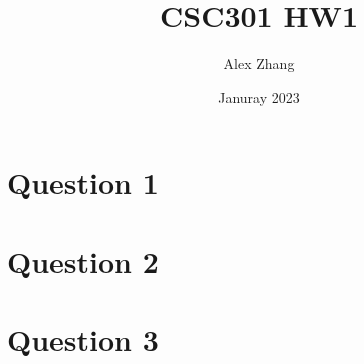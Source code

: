 \documentclass{article}
\title{CSC301 HW1}
\author{Alex Zhang}
\date{Januray 2023}
\begin{document}
\maketitle
\section{Question 1}

\section{Question 2}

\section{Question 3}
    
\end{document}
